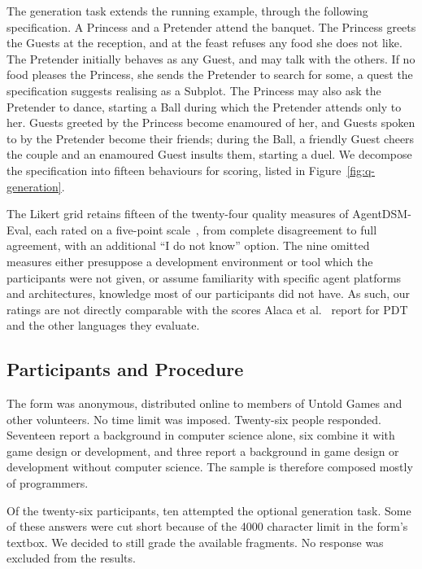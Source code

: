 The generation task extends the running example, through the following specification. A Princess and a Pretender attend the banquet. The Princess greets the Guests at the reception, and at the feast refuses any food she does not like. The Pretender initially behaves as any Guest, and may talk with the others. If no food pleases the Princess, she sends the Pretender to search for some, a quest the specification suggests realising as a Subplot. The Princess may also ask the Pretender to dance, starting a Ball during which the Pretender attends only to her. Guests greeted by the Princess become enamoured of her, and Guests spoken to by the Pretender become their friends; during the Ball, a friendly Guest cheers the couple and an enamoured Guest insults them, starting a duel. We decompose the specification into fifteen behaviours for scoring, listed in Figure~\ref{fig:q-generation}.
 
The Likert grid retains fifteen of the twenty-four quality measures of AgentDSM-Eval, each rated on a five-point scale~\cite{Likert1932}, from complete disagreement to full agreement, with an additional ``I do not know'' option. The nine omitted measures either presuppose a development environment or tool which the participants were not given, or assume familiarity with specific agent platforms and architectures, knowledge most of our participants did not have. As such, our ratings are not directly comparable with the scores Alaca et al.~\cite{Alaca2021} report for PDT and the other languages they evaluate.

 \subsection{Participants and Procedure}
\label{sec:q-participants}
 
The form was anonymous, distributed online to members of Untold Games and other volunteers. No time limit was imposed. Twenty-six people responded. Seventeen report a background in computer science alone, six combine it with game design or development, and three report a background in game design or development without computer science. The sample is therefore composed mostly of programmers.
 
Of the twenty-six participants, ten attempted the optional generation task. Some of these answers were cut short because of the 4000 character limit in the form's textbox. We decided to still grade the available fragments. No response was excluded from the results.

